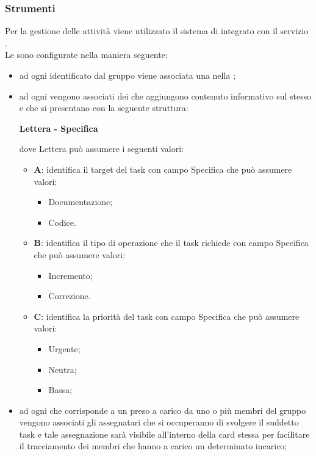 	\subsubsection{Strumenti}
	Per la gestione delle attività viene utilizzato il sistema di  integrato con il servizio .\\
	Le  sono configurate nella maniera seguente:
	\begin{itemize}
		\item ad ogni  identificato dal gruppo viene associata una  nella ;
		\item ad ogni  vengono associati dei  che aggiungono contenuto informativo sul  stesso e che si presentano con la seguente struttura:
		\begin{center}
 			{\bfseries Lettera - Specifica}
 		\end{center}
dove Lettera può assumere i seguenti valori:
		\begin{itemize}
			\item \textbf{A}: identifica il target del task con campo Specifica che può assumere valori:
			\begin{itemize}
				\item Documentazione;
				\item Codice.
			\end{itemize}
			\item \textbf{B}: identifica il tipo di operazione che il task richiede con campo Specifica che può assumere valori:
			\begin{itemize}
				\item Incremento;
				\item Correzione.
			\end{itemize}
			\item \textbf{C}: identifica la priorità del task con campo Specifica che può assumere valori:
			\begin{itemize}
				\item Urgente;
				\item Neutra;
				\item Bassa;
			\end{itemize}
		\end{itemize}
		\item ad ogni  che corrisponde a un  preso a carico da uno o più membri del gruppo vengono associati gli assegnatari che si occuperanno di svolgere il suddetto task e tale assegnazione sarà visibile all'interno della card stessa per facilitare il tracciamento dei membri che hanno a carico un determinato incarico;

\end{itemize}
